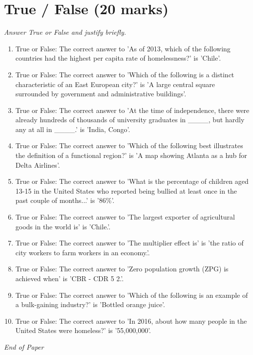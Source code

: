 \documentclass[12pt]{article}
\begin{document}
\section*{True / False (20 marks)}
\textit{Answer True or False and justify briefly.}
\begin{enumerate}[label=\arabic*.]
\item True or False: The correct answer to 'As of 2013, which of the following countries had the highest per capita rate of homelessness?' is 'Chile'.
\item True or False: The correct answer to 'Which of the following is a distinct characteristic of an East European city?' is 'A large central square surrounded by government and administrative buildings'.
\item True or False: The correct answer to 'At the time of independence, there were already hundreds of thousands of university graduates in \_\_\_\_, but hardly any at all in \_\_\_\_.' is 'India, Congo'.
\item True or False: The correct answer to 'Which of the following best illustrates the definition of a functional region?' is 'A map showing Atlanta as a hub for Delta Airlines'.
\item True or False: The correct answer to 'What is the percentage of children aged 13-15 in the United States who reported being bullied at least once in the past couple of months...' is '86\%'.
\item True or False: The correct answer to 'The largest exporter of agricultural goods in the world is' is 'Chile.'.
\item True or False: The correct answer to 'The multiplier effect is' is 'the ratio of city workers to farm workers in an economy.'.
\item True or False: The correct answer to 'Zero population growth (ZPG) is achieved when' is 'CBR - CDR 5 2.'.
\item True or False: The correct answer to 'Which of the following is an example of a bulk-gaining industry?' is 'Bottled orange juice'.
\item True or False: The correct answer to 'In 2016, about how many people in the United States were homeless?' is '55,000,000'.
\end{enumerate}

\vfill
\noindent\textit{End of Paper}
\end{document}
